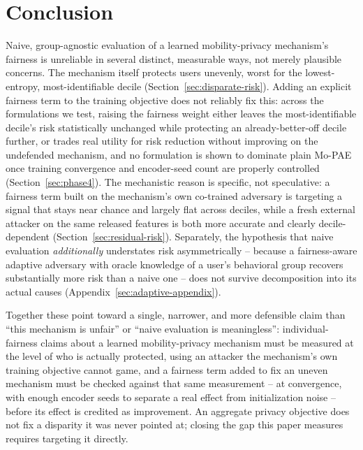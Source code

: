 \section{Conclusion}
\label{sec:conclusion}

Naive, group-agnostic evaluation of a learned mobility-privacy
mechanism's fairness is unreliable in several distinct, measurable ways,
not merely plausible concerns. The mechanism itself protects users
unevenly, worst for the lowest-entropy, most-identifiable decile
(Section~\ref{sec:disparate-risk}). Adding an explicit fairness term to
the training objective does not reliably fix this: across the
formulations we test, raising the fairness weight either leaves the
most-identifiable decile's risk statistically unchanged while
protecting an already-better-off decile further, or trades real utility
for risk reduction without improving on the undefended mechanism, and
no formulation is shown to dominate plain Mo-PAE once training
convergence and encoder-seed count are properly controlled
(Section~\ref{sec:phase4}). The mechanistic reason is specific, not
speculative: a fairness term built on the mechanism's own co-trained
adversary is targeting a signal that stays near chance and largely flat
across deciles, while a fresh external attacker on the same released
features is both more accurate and clearly decile-dependent
(Section~\ref{sec:residual-risk}). Separately, the hypothesis that naive
evaluation \emph{additionally} understates risk asymmetrically -- because
a fairness-aware adaptive adversary with oracle knowledge of a user's
behavioral group recovers substantially more risk than a naive one --
does not survive decomposition into its actual causes
(Appendix~\ref{sec:adaptive-appendix}).

Together these point toward a single, narrower, and more defensible
claim than ``this mechanism is unfair'' or ``naive evaluation is
meaningless'': individual-fairness claims about a learned
mobility-privacy mechanism must be measured at the level of who is
actually protected, using an attacker the mechanism's own training
objective cannot game, and a fairness term added to fix an uneven
mechanism must be checked against that same measurement -- at
convergence, with enough encoder seeds to separate a real effect from
initialization noise -- before its effect is credited as improvement.
An aggregate privacy objective does not fix a disparity it was never
pointed at; closing the gap this paper measures requires targeting it
directly.
